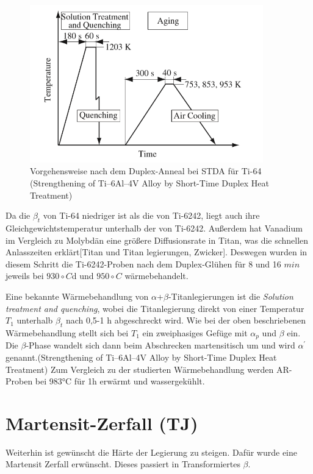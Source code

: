 \begin{figure}[H]
	\centering
	\includegraphics[width=0.9\textwidth]{Bilder/ts-stda}
	\caption{Vorgehensweise nach dem Duplex-Anneal bei STDA für Ti-64 (Strengthening of Ti–6Al–4V Alloy by Short-Time Duplex Heat Treatment)}
	\label{STDA}
\end{figure}

Da die $\beta_{t}$ von Ti-64 niedriger ist als die von Ti-6242, liegt auch ihre Gleichgewichtstemperatur unterhalb der von Ti-6242. Außerdem hat Vanadium im Vergleich zu Molybdän eine größere Diffusionsrate in Titan, was die schnellen Anlasszeiten erklärt[Titan und Titan legierungen, Zwicker]. Deswegen wurden in diesem Schritt die Ti-6242-Proben nach dem Duplex-Glühen für 8 und 16 $min$ jeweils bei $930\circ C$d und $950\circ C$ wärmebehandelt.

Eine bekannte Wärmebehandlung von $\alpha$+$\beta$-Titanlegierungen ist die  \textit{Solution treatment and quenching}, wobei die Titanlegierung direkt von einer Temperatur $T_{1}$ unterhalb  $\beta_{t}$ nach 0,5-1 h abgeschreckt wird. Wie bei der oben beschriebenen Wärmebehandlung stellt sich bei $T_{1}$ ein zweiphasiges Gefüge mit $\alpha_p$ und $\beta$ ein. Die $\beta$-Phase wandelt sich  dann beim Abschrecken martensitisch um und wird $\alpha^\prime$ genannt.(Strengthening of Ti–6Al–4V Alloy by Short-Time Duplex Heat Treatment)
Zum Vergleich zu der studierten Wärmebehandlung werden AR-Proben bei 983°C für 1h erwärmt und wassergekühlt.

\section{Martensit-Zerfall (TJ)}

Weiterhin ist gewünscht die Härte der Legierung zu steigen. Dafür wurde eine Martensit Zerfall erwünscht. Dieses passiert in Transformiertes $\beta$. 

